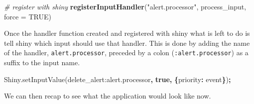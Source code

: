 \documentclass[
]{krantz}
\makeatletter
\newenvironment{Shaded}{\begin{snugshade}}{\end{snugshade}}
\newcommand{\AttributeTok}[1]{\textcolor[rgb]{0.61,0.61,0.61}{#1}}
\newcommand{\CommentTok}[1]{\textcolor[rgb]{0.37,0.37,0.37}{\textit{#1}}}
\newcommand{\DataTypeTok}[1]{\textcolor[rgb]{0.27,0.27,0.27}{#1}}
\newcommand{\KeywordTok}[1]{\textcolor[rgb]{0.27,0.27,0.27}{\textbf{#1}}}
\newcommand{\NormalTok}[1]{#1}
\newcommand{\OperatorTok}[1]{\textcolor[rgb]{0.43,0.43,0.43}{\textbf{#1}}}
\newcommand{\OtherTok}[1]{\textcolor[rgb]{0.37,0.37,0.37}{#1}}
\newcommand{\StringTok}[1]{\textcolor[rgb]{0.5,0.5,0.5}{#1}}
\newcommand{\VariableTok}[1]{\textcolor[rgb]{0,0,0}{#1}}
\newenvironment{kframe}{%
\medskip{}
\setlength{\fboxsep}{.8em}
 \def\at@end@of@kframe{}%
 \ifinner\ifhmode%
  \def\at@end@of@kframe{\end{minipage}}%
  \begin{minipage}{\columnwidth}%
 \fi\fi%
 \def\FrameCommand##1{\hskip\@totalleftmargin \hskip-\fboxsep
 \colorbox{shadecolor}{##1}\hskip-\fboxsep
     \hskip-\linewidth \hskip-\@totalleftmargin \hskip\columnwidth}%
 \MakeFramed {\advance\hsize-\width
   \@totalleftmargin\z@ \linewidth\hsize
   \@setminipage}}%
 {\par\unskip\endMakeFramed%
 \at@end@of@kframe}
\renewenvironment{Shaded}{\begin{kframe}}{\end{kframe}}
\makeatother
\begin{document}
\begin{Shaded}
\begin{Highlighting}[]
\CommentTok{\# register with shiny}
\KeywordTok{registerInputHandler}\NormalTok{(}\StringTok{"alert.processor"}\NormalTok{, process\_input, }\DataTypeTok{force =} \OtherTok{TRUE}\NormalTok{)}
\end{Highlighting}
\end{Shaded}

Once the handler function created and registered with shiny what is left to do is tell shiny which input should use that handler. This is done by adding the name of the handler, \texttt{alert.processor}, preceded by a colon (\texttt{:alert.processor}) as a suffix to the input name.

\begin{Shaded}
\begin{Highlighting}[]
\VariableTok{Shiny}\NormalTok{.}\AttributeTok{setInputValue}\NormalTok{(}\StringTok{\textquotesingle{}delete\_alert:alert.processor\textquotesingle{}}\OperatorTok{,} \KeywordTok{true}\OperatorTok{,} \OperatorTok{\{}\DataTypeTok{priority}\OperatorTok{:} \StringTok{\textquotesingle{}event\textquotesingle{}}\OperatorTok{\}}\NormalTok{)}\OperatorTok{;}
\end{Highlighting}
\end{Shaded}

We can then recap to see what the application would look like now.
\end{document}
